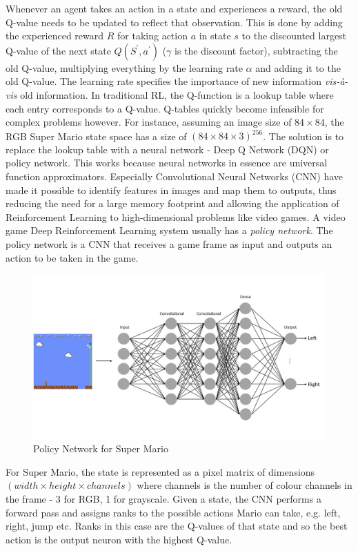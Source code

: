 \documentclass[notitlepage,a4paper,11pt]{article}
\begin{document}
Whenever an agent takes an action in a state and experiences a reward, the old Q-value needs to be updated to reflect that observation. This is done by adding the experienced reward $R$ for taking action $a$ in state $s$ to the discounted largest Q-value of the next state $Q(S^\prime, a^\prime)$ ($\gamma$ is the discount factor), subtracting the old Q-value, multiplying everything by the learning rate $\alpha$ and adding it to the old Q-value. The learning rate specifies the importance of new information \textit{vis-à-vis} old information. In traditional RL, the Q-function is a lookup table where each entry corresponds to a Q-value. Q-tables quickly become infeasible for complex problems however. For instance, assuming an image size of $84 \times 84$, the RGB Super Mario state space has a size of $(84 \times 84 \times 3)^{256}$. The solution is to replace the lookup table with a neural network - Deep Q Network (DQN) or policy network. This works because neural networks in essence are universal function approximators. Especially Convolutional Neural Networks (CNN) have made it possible to identify features in images and map them to outputs, thus reducing the need for a large memory footprint and allowing the application of Reinforcement Learning to high-dimensional problems like video games. A video game Deep Reinforcement Learning system usually has a \textit{policy network}. The policy network is a CNN that receives a game frame as input and outputs an action to be taken in the game. 

\begin{figure}[!htb]
\centering
\includegraphics[trim={0 2cm 0 2cm},clip,width=1\linewidth]{figs/deep_rl_video_game.png}
\caption{Policy Network for Super Mario} \label{fig:2}
\end{figure}

For Super Mario, the state is represented as a pixel matrix of dimensions $(width \times height \times channels)$ where channels is the number of colour channels in the frame - 3 for RGB, 1 for grayscale. Given a state, the CNN performs a forward pass and assigns ranks to the possible actions Mario can take, e.g. left, right, jump etc. Ranks in this case are the Q-values of that state and so the best action is the output neuron with the highest Q-value.
\end{document}
